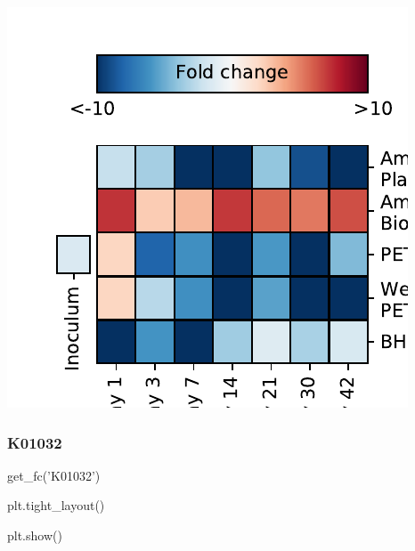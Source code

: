 \documentclass[
]{article}
\newenvironment{Shaded}{\begin{snugshade}}{\end{snugshade}}
\newcommand{\NormalTok}[1]{#1}
\newcommand{\StringTok}[1]{\textcolor[rgb]{0.31,0.60,0.02}{#1}}
\begin{document}
\includegraphics{20-6-15-PET-plastisphere-PICRUSt2_files/figure-latex/plot_fc_K01031-1.pdf}

\hypertarget{k01032-1}{%
\subsubsection{K01032}\label{k01032-1}}

\begin{Shaded}
\begin{Highlighting}[]
\NormalTok{get_fc(}\StringTok{'K01032'}\NormalTok{)}
\end{Highlighting}
\end{Shaded}

\begin{Shaded}
\begin{Highlighting}[]
\NormalTok{plt.tight_layout()}
\end{Highlighting}
\end{Shaded}

\begin{Shaded}
\begin{Highlighting}[]
\NormalTok{plt.show()}
\end{Highlighting}
\end{Shaded}
\end{document}
